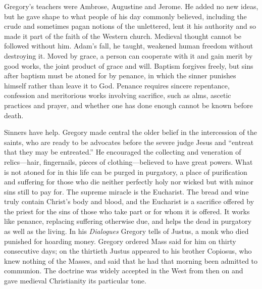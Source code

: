 Gregory's teachers were Ambrose, Augustine and Jerome. He added no new ideas, but he gave shape to what people of his day commonly believed, including the crude and sometimes pagan notions of the unlettered, lent it
his authority and so made it part of the faith of the Western church. Medieval thought cannot be
followed without him. Adam's fall, he taught, weakened human freedom without destroying it. Moved by
grace, a person can cooperate with it and gain merit by good works, the joint product of grace and
will. Baptism forgives freely, but sins after baptism must be atoned for by penance, in which the
sinner punishes himself rather than leave it to God. Penance requires sincere repentance, confession
and meritorious works involving sacrifice, such as alms, ascetic practices and prayer, and whether
one has done enough cannot be known before death.

Sinners have help. Gregory made central the older belief in the intercession of the saints, who are
ready to be advocates before the severe judge Jesus and ``entreat that they may be entreated.'' He
encouraged the collecting and veneration of relics---hair, fingernails, pieces of clothing---believed to
have great powers. What is not atoned for in this life can be purged in purgatory, a place
of purification and suffering for those who die neither perfectly holy nor wicked but with minor sins
still to pay for. The supreme miracle is the Eucharist. The bread and wine truly contain Christ's body and blood, and the Eucharist is a sacrifice offered by the priest for the sins of those who
take part or for whom it is offered. It works like penance, replacing suffering otherwise due, and
helps the dead in purgatory as well as the living. In his \emph{Dialogues} Gregory tells of Justus, a
monk who died punished for hoarding money. Gregory ordered Mass said for him on thirty consecutive
days; on the thirtieth Justus appeared to his brother Copiosus, who knew nothing of the Masses, and
said that he had that morning been admitted to communion. The doctrine was widely accepted in the West
from then on and gave medieval Christianity its particular tone.

\begin{keyfacts}
\end{keyfacts}
